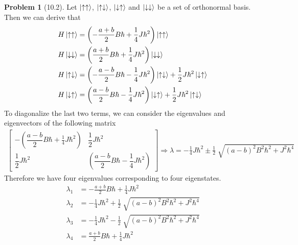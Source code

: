 \documentclass[twoside,11pt]{article}
\theoremstyle{definition}
\newtheorem{problem}{Problem}
\theoremstyle{remark}
\begin{document}
\begin{problem}[10.2]
Let $\ket{\uparrow\uparrow}$, $\ket{\uparrow\downarrow}$,
$\ket{\downarrow\uparrow}$ and $\ket{\downarrow\downarrow}$ 
be a set of orthonormal basis.
Then we can derive that
\begin{align*}
    H\ket{\uparrow\uparrow} &= \left(
        -\frac{a+b}{2}B\hbar + \frac{1}{4}J\hbar^2
    \right)\ket{\uparrow\uparrow}\\
    H\ket{\downarrow\downarrow} &= 
    \left(
        \frac{a+b}{2}B\hbar+\frac{1}{4}J\hbar^2
    \right)\ket{\downarrow\downarrow}\\
    H\ket{\uparrow\downarrow} &=
    \left(
        -\frac{a-b}{2}B\hbar-\frac{1}{4}J\hbar^2
    \right)\ket{\uparrow\downarrow}
    + \frac{1}{2}J\hbar^2\ket{\downarrow\uparrow}\\
    H\ket{\downarrow\uparrow} &=
    \left(
        \frac{a-b}{2}B\hbar-\frac{1}{4}J\hbar^2
    \right)\ket{\downarrow\uparrow}
    + \frac{1}{2}J\hbar^2\ket{\uparrow\downarrow}
\end{align*}
To diagonalize the last two terms, we can consider the eigenvalues and
eigenvectors of the following matrix
\begin{align*}
    \begin{bmatrix}
        -\left(\dfrac{a-b}{2}B\hbar+\frac{1}{4}J\hbar^2\right) & 
        \dfrac{1}{2}J\hbar^2\\[1em]
        \dfrac{1}{2}J\hbar^2 & 
        \left(\dfrac{a-b}{2}B\hbar-\dfrac{1}{4}J\hbar^2\right)
    \end{bmatrix}
    \Rightarrow
    \lambda=-\frac{1}{4}J\hbar^2\pm\frac{1}{2}\sqrt[]{(a-b)^2B^2\hbar^2+J^2\hbar^4}
\end{align*}
Therefore we have four eigenvalues corresponding to four eigenstates.
\begin{align*}
    \lambda_1 &= -\frac{a+b}{2}B\hbar + \frac{1}{4}J\hbar^2\\
    \lambda_2 &= -\frac{1}{4}J\hbar^2 + \frac{1}{2}\sqrt[]{(a-b)^2B^2\hbar^2+J^2\hbar^4}\\
    \lambda_3 &= -\frac{1}{4}J\hbar^2 - \frac{1}{2}\sqrt[]{(a-b)^2B^2\hbar^2+J^2\hbar^4}\\
    \lambda_4 &= \frac{a+b}{2}B\hbar + \frac{1}{4}J\hbar^2
\end{align*}

\end{problem}
\end{document}
